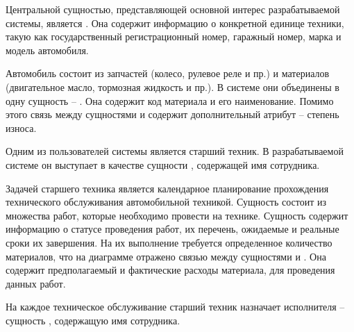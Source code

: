 \documentclass[../nirs.tex]{subfiles}
\begin{document}
\pagebreak

Центральной сущностью, представляющей основной интерес разрабатываемой системы,
является . Она содержит информацию о конкретной единице
техники, такую как государственный регистрационный номер, гаражный номер, марка
и модель автомобиля.

Автомобиль состоит из запчастей (колесо, рулевое реле и пр.) и материалов
(двигательное масло, тормозная жидкость и пр.). В системе они объединены в одну
сущность -- . Она содержит код материала и его наименование.
Помимо этого связь между сущностями  и
 содержит дополнительный атрибут -- степень износа.

Одним из пользователей системы является старший техник. В разрабатываемой
системе он выступает в качестве сущности , содержащей
имя сотрудника.

Задачей старшего техника является календарное планирование прохождения
технического обслуживания автомобильной техникой. Сущность  состоит из множества работ, которые необходимо провести на
технике. Сущность  содержит информацию о
статусе проведения работ, их перечень, ожидаемые и реальные сроки их завершения.
На их выполнение требуется определенное количество материалов, что на диаграмме
отражено связью между сущностями  и
. Она содержит предполагаемый и фактические расходы
материала, для проведения данных работ.

На каждое техническое обслуживание старший техник назначает исполнителя --
сущность , содержащую имя сотрудника.
\end{document}
